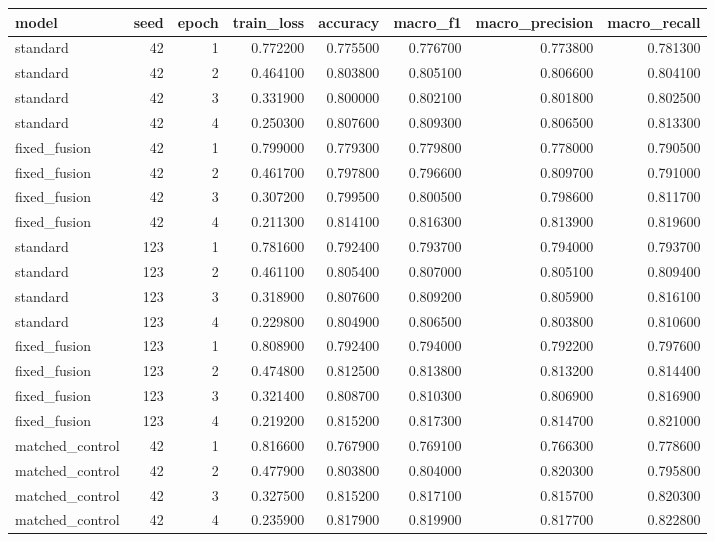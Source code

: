 \begin{tabular}{lrrrrrrr}
\toprule
model & seed & epoch & train\_loss & accuracy & macro\_f1 & macro\_precision & macro\_recall \\
\midrule
standard & 42 & 1 & 0.772200 & 0.775500 & 0.776700 & 0.773800 & 0.781300 \\
standard & 42 & 2 & 0.464100 & 0.803800 & 0.805100 & 0.806600 & 0.804100 \\
standard & 42 & 3 & 0.331900 & 0.800000 & 0.802100 & 0.801800 & 0.802500 \\
standard & 42 & 4 & 0.250300 & 0.807600 & 0.809300 & 0.806500 & 0.813300 \\
fixed\_fusion & 42 & 1 & 0.799000 & 0.779300 & 0.779800 & 0.778000 & 0.790500 \\
fixed\_fusion & 42 & 2 & 0.461700 & 0.797800 & 0.796600 & 0.809700 & 0.791000 \\
fixed\_fusion & 42 & 3 & 0.307200 & 0.799500 & 0.800500 & 0.798600 & 0.811700 \\
fixed\_fusion & 42 & 4 & 0.211300 & 0.814100 & 0.816300 & 0.813900 & 0.819600 \\
standard & 123 & 1 & 0.781600 & 0.792400 & 0.793700 & 0.794000 & 0.793700 \\
standard & 123 & 2 & 0.461100 & 0.805400 & 0.807000 & 0.805100 & 0.809400 \\
standard & 123 & 3 & 0.318900 & 0.807600 & 0.809200 & 0.805900 & 0.816100 \\
standard & 123 & 4 & 0.229800 & 0.804900 & 0.806500 & 0.803800 & 0.810600 \\
fixed\_fusion & 123 & 1 & 0.808900 & 0.792400 & 0.794000 & 0.792200 & 0.797600 \\
fixed\_fusion & 123 & 2 & 0.474800 & 0.812500 & 0.813800 & 0.813200 & 0.814400 \\
fixed\_fusion & 123 & 3 & 0.321400 & 0.808700 & 0.810300 & 0.806900 & 0.816900 \\
fixed\_fusion & 123 & 4 & 0.219200 & 0.815200 & 0.817300 & 0.814700 & 0.821000 \\
matched\_control & 42 & 1 & 0.816600 & 0.767900 & 0.769100 & 0.766300 & 0.778600 \\
matched\_control & 42 & 2 & 0.477900 & 0.803800 & 0.804000 & 0.820300 & 0.795800 \\
matched\_control & 42 & 3 & 0.327500 & 0.815200 & 0.817100 & 0.815700 & 0.820300 \\
matched\_control & 42 & 4 & 0.235900 & 0.817900 & 0.819900 & 0.817700 & 0.822800 \\

\end{tabular}
